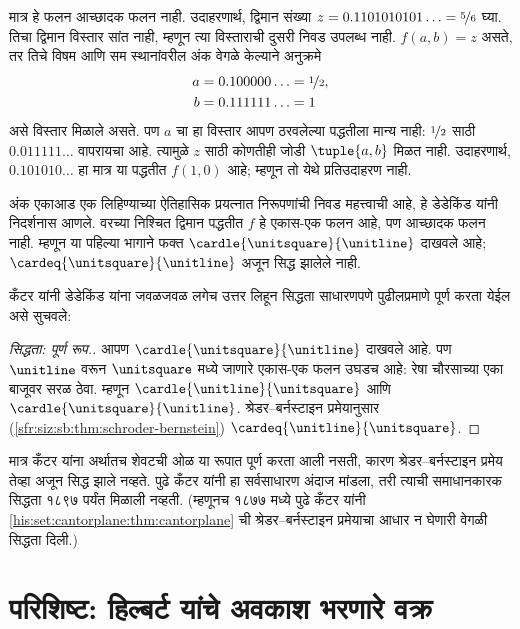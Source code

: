मात्र हे फलन आच्छादक फलन नाही. उदाहरणार्थ,
द्विमान संख्या $z=0.1101010101\ldots=\nicefrac56$ घ्या.
तिचा द्विमान विस्तार सांत नाही, म्हणून त्या विस्ताराची दुसरी
निवड उपलब्ध नाही. $f(a,b)=z$ असते, तर तिचे विषम आणि
सम स्थानांवरील अंक वेगळे केल्याने अनुक्रमे
\begin{align*}
a&=0.100000\ldots=\nicefrac12,\\
b&=0.111111\ldots=1
\end{align*}
असे विस्तार मिळाले असते. पण $a$ चा हा विस्तार आपण
ठरवलेल्या पद्धतीला मान्य नाही: $\nicefrac12$ साठी
$0.011111\ldots$ वापरायचा आहे. त्यामुळे $z$ साठी
कोणतीही जोडी $\tuple{a,b}$ मिळत नाही.
उदाहरणार्थ, $0.101010\ldots$ हा मात्र
या पद्धतीत $f(1,0)$ आहे; म्हणून तो येथे प्रतिउदाहरण नाही.

अंक एकाआड एक लिहिण्याच्या ऐतिहासिक प्रयत्नात
निरूपणांची निवड महत्त्वाची आहे, हे डेडेकिंड यांनी
निदर्शनास आणले. वरच्या निश्चित द्विमान पद्धतीत $f$
हे एकास-एक फलन आहे, पण आच्छादक फलन नाही.
म्हणून या पहिल्या भागाने फक्त
$\cardle{\unitsquare}{\unitline}$ दाखवले आहे;
$\cardeq{\unitsquare}{\unitline}$ अजून सिद्ध झालेले नाही.

कँटर यांनी डेडेकिंड यांना जवळजवळ लगेच उत्तर लिहून सिद्धता साधारणपणे पुढीलप्रमाणे पूर्ण करता येईल असे सुचवले:

\begin{proof}[सिद्धता: पूर्ण रूप.]
आपण $\cardle{\unitsquare}{\unitline}$ दाखवले आहे. पण $\unitline$ वरून $\unitsquare$ मध्ये जाणारे एकास-एक फलन उघडच आहे: रेषा चौरसाच्या एका बाजूवर सरळ ठेवा. म्हणून $\cardle{\unitline}{\unitsquare}$ आणि $\cardle{\unitsquare}{\unitline}$. श्रेडर--बर्नस्टाइन प्रमेयानुसार (\ref{sfr:siz:sb:thm:schroder-bernstein}) $\cardeq{\unitline}{\unitsquare}$.
\end{proof}

मात्र कँटर यांना अर्थातच शेवटची ओळ या रूपात पूर्ण करता आली नसती, कारण श्रेडर--बर्नस्टाइन प्रमेय तेव्हा अजून सिद्ध झाले नव्हते. पुढे कँटर यांनी हा सर्वसाधारण अंदाज मांडला, तरी त्याची समाधानकारक सिद्धता १८९७ पर्यंत मिळाली नव्हती. (म्हणूनच १८७७ मध्ये पुढे कँटर यांनी \ref{his:set:cantorplane:thm:cantorplane} ची श्रेडर--बर्नस्टाइन प्रमेयाचा आधार न घेणारी वेगळी सिद्धता दिली.)









\section{परिशिष्ट: हिल्बर्ट यांचे अवकाश भरणारे वक्र}\label{his:set:hilbertcurve:sec}

